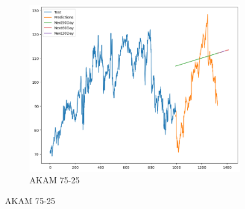 \documentclass{ieeeojies}
\begin{document}
\begin{figure}[H]
    \hfill
    \begin{subfigure}[h]{0.33\linewidth}
        \centering
        \includegraphics[width=\linewidth]{Linear Plot/AKAM_Linear Regression_75_25.png}
        \caption{AKAM 75-25}
        \label{fig:akam-75-25}
    \end{subfigure}
    \vspace{10pt}
\end{figure}
 \vspace{-20pt}
\end{document}
